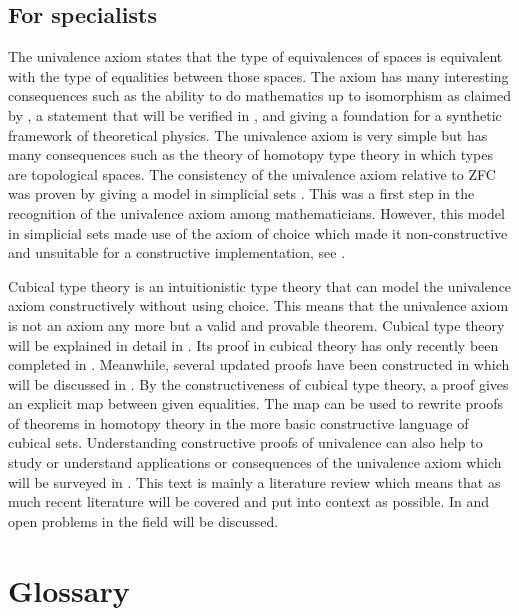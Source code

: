 \documentclass[12pt,a4paper,twoside,xetex]{book} %
\begin{document}
\section*{For specialists}

The univalence axiom states that the type of equivalences of spaces is equivalent with the type of equalities between those spaces. The axiom has many interesting consequences such as the ability to do mathematics up to isomorphism as claimed by \cite{Voevodsky2013}, a statement that will be verified in , and giving a foundation for a synthetic framework of theoretical physics. The univalence axiom is very simple but has many consequences such as the theory of homotopy type theory in which types are topological spaces. The  consistency of the univalence axiom relative to ZFC was proven by giving a model in simplicial sets \cite{Kapulkin2012}. This was a first step in the recognition of the univalence axiom among mathematicians. However, this model in simplicial sets made use of the axiom of choice which made it non-constructive and unsuitable for a constructive implementation, see .

Cubical type theory is an intuitionistic type theory that can model the univalence axiom constructively without using choice. This means that the univalence axiom is not an axiom any more but a valid and provable theorem. Cubical type theory will be explained in detail in . Its proof in cubical theory has only recently been completed in \cite{Cohen2016}. Meanwhile, several updated proofs have been constructed in \cite{Sterling2018b, Moertberg2018} which will be discussed in . By the constructiveness of cubical type theory, a proof gives an explicit map between given equalities. The map can be used to rewrite proofs of theorems in homotopy theory in the more basic constructive language of cubical sets. Understanding constructive proofs of univalence can also help to study or understand applications or consequences of the univalence axiom which will be surveyed in . This text is mainly a literature review which means that as much recent literature will be covered and put into context as possible. In  and  open problems in the field will be discussed.

\chapter*{Glossary}
\end{document}
